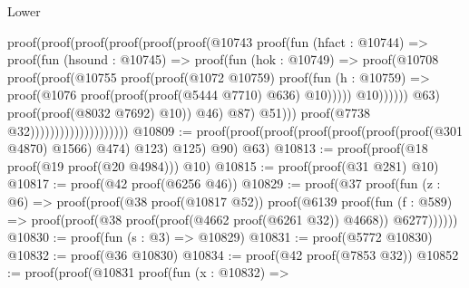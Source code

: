 \begin{lexlean}{Lower}
\begin{coremodule}
                                                    proof(proof(proof(proof(proof(proof(@10743
                                                                  proof(fun (hfact : @10744) =>
                                                                    proof(fun (hsound : @10745) =>
                                                                      proof(fun (hok : @10749) =>
                                                                        proof(@10708
                                                                            proof(proof(@10755
                                                                                  proof(proof(@1072
                                                                                        @10759)
                                                                                      proof(fun (h : @10759) =>
                                                                                        proof(@1076
                                                                                            proof(proof(proof(@5444
                                                                                                    @7710)
                                                                                                  @636)
                                                                                                @10)))))
                                                                                @10))))))
                                                                @63)
                                                              proof(proof(@8032 @7692) @10))
                                                            @46)
                                                          @87)
                                                        @51)))
                                                proof(@7738 @32))))))))))))))))))))
@10809 := proof(proof(proof(proof(proof(proof(proof(@301 @4870) @1566) @474) @123) @125) @90) @63)
@10813 := proof(proof(@18 proof(@19 proof(@20 @4984))) @10)
@10815 := proof(proof(@31 @281) @10)
@10817 := proof(@42 proof(@6256 @46))
@10829 := proof(@37
      proof(fun (z : @6) =>
        proof(proof(@38 proof(@10817 @52))
            proof(@6139
                proof(fun (f : @589) =>
                  proof(proof(@38 proof(proof(@4662 proof(@6261 @32)) @4668)) @6277))))))
@10830 := proof(fun (s : @3) => @10829)
@10831 := proof(@5772 @10830)
@10832 := proof(@36 @10830)
@10834 := proof(@42 proof(@7853 @32))
@10852 := proof(proof(@10831
        proof(fun (x : @10832) =>

\end{coremodule}
\end{lexlean}
